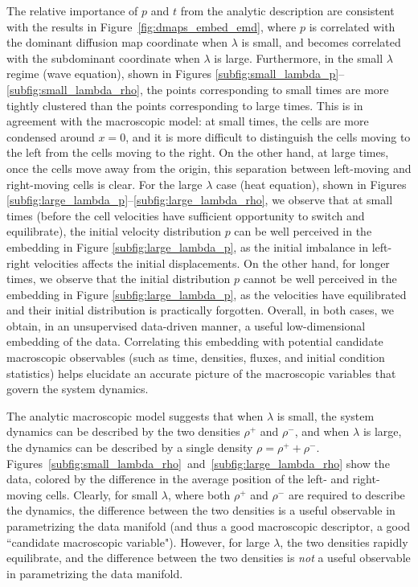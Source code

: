 \documentclass[3p]{elsarticle}
\begin{document}
The relative importance of $p$ and $t$ from the analytic description are consistent with the results 
in Figure~\ref{fig:dmaps_embed_emd}, where $p$ is correlated with the dominant diffusion map coordinate 
when $\lambda$ is small, and becomes correlated with the subdominant coordinate when $\lambda$ is large.
%
Furthermore, in the small $\lambda$ regime (wave equation), shown in 
Figures \ref{subfig:small_lambda_p}--\ref{subfig:small_lambda_rho}, the points corresponding to 
small times are more tightly clustered than the points corresponding to large times.
%
This is in agreement with the macroscopic model: at small times, the cells are more 
condensed around $x=0$, and it is more difficult to distinguish the cells moving to the left from the cells moving to the right.
%
On the other hand, at large times, once the cells move away from the origin, this separation between left-moving and
right-moving cells is clear.
%
For the large $\lambda$ case (heat equation), shown in Figures \ref{subfig:large_lambda_p}--\ref{subfig:large_lambda_rho}, 
we observe that at small times (before the cell velocities have sufficient opportunity to switch and equilibrate), the initial velocity distribution $p$ can be well perceived in the
embedding in Figure \ref{subfig:large_lambda_p}, as the initial imbalance in left-right velocities affects
the initial displacements.
%
On the other hand, for longer times, we observe that the initial distribution $p$ cannot be well perceived
in the embedding in Figure \ref{subfig:large_lambda_p}, 
as the velocities have equilibrated and their initial distribution is practically forgotten.
%
Overall, in both cases, we obtain, in an unsupervised data-driven manner, a useful low-dimensional embedding of the data.
%
Correlating this embedding with potential candidate macroscopic observables (such as time, densities, fluxes, and initial condition statistics) helps elucidate
an accurate picture of the macroscopic variables that govern the system dynamics.

The analytic macroscopic model suggests that when $\lambda$ is small, the system dynamics 
can be described by the two densities $\rho^+$ and $\rho^-$, 
and when $\lambda$ is large, the dynamics can be described by a single density $\rho = \rho^+ + \rho^-$.
%
Figures~\ref{subfig:small_lambda_rho}~and~\ref{subfig:large_lambda_rho} show the data, 
colored by the difference in the average position of the left- and right-moving cells.
%
Clearly, for small $\lambda$, where both $\rho^+$ and $\rho^-$ are required to describe the dynamics, 
the difference between the two densities is a useful observable in parametrizing the data manifold
(and thus a good macroscopic descriptor, a good ``candidate macroscopic variable").
%
However, for large $\lambda$, the two densities rapidly equilibrate, and the difference between the two 
densities is {\em not} a useful observable in parametrizing the data manifold. 
\end{document}
